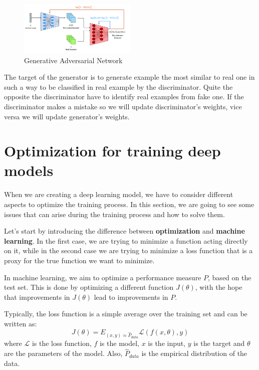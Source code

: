 \begin{figure}[!ht]
    \centering
    \includegraphics[width=0.5\textwidth]{img/GAN.png}
    \caption{Generative Adversarial Network}
    \label{fig:gan}
\end{figure}

The target of the generator is to generate example the most similar to real one
in such a way to be classified in real example by the discriminator. Quite the
opposite the discriminator have to identify real examples from fake one. If the
discriminator makes a mistake so we will update discriminator's weights, vice
versa we will update generator's weights.
\section{Optimization for training deep models}
When we are creating a deep learning model, we have to consider different aspects
to optimize the training process. In this section, we are going to see some
issues that can arise during the training process and how to solve them.

Let's start by introducing the difference between \textbf{optimization} and
\textbf{machine learning}. In the first case, we are trying to minimize a function
acting directly on it, while in the second case we are trying to minimize a loss
function that is a proxy for the true function we want to minimize.

In machine learning, we aim to optimize a performance measure $P$, based on the
test set. This is done by optimizing a different function $J(\theta)$, with the
hope that improvements in $J(\theta)$ lead to improvements in $P$.

Typically, the loss function is a simple average over the training set and can be
written as:
\begin{equation}
    J(\theta) = E_{(x, y) \approx \hat{P}_{data}} \mathcal{L}(f(x, \theta), y)
\end{equation}
where $\mathcal{L}$ is the loss function, $f$ is the model, $x$ is the input, $y$
is the target and $\theta$ are the parameters of the model. Also, $\hat{P}_{data}$ is
the empirical distribution of the data.

